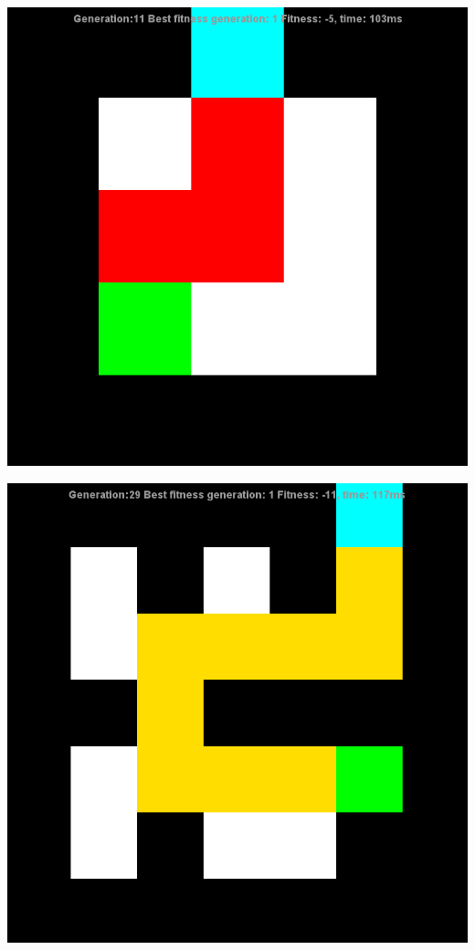 \documentclass[12pt]{article} %
\begin{document}
\begin{center}

\includegraphics[scale=.6]{maze1}

\includegraphics[scale=.6]{maze2}


\end{center}
\end{document}
